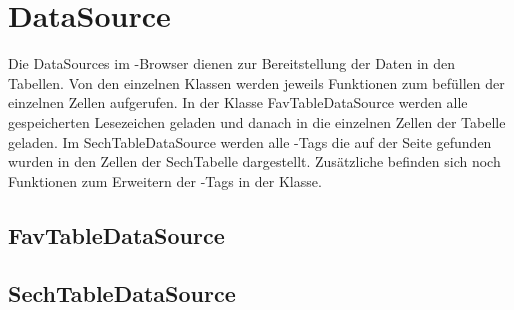 
\section{DataSource}
Die DataSources im \SECH-Browser dienen zur Bereitstellung der Daten in den Tabellen. Von den einzelnen Klassen werden jeweils Funktionen zum befüllen der einzelnen Zellen aufgerufen. In der Klasse FavTableDataSource werden alle gespeicherten Lesezeichen geladen und danach in die einzelnen Zellen der Tabelle geladen. Im SechTableDataSource werden alle \SEARCH-Tags die auf der Seite gefunden wurden in den Zellen der SechTabelle dargestellt. Zusätzliche befinden sich noch Funktionen zum Erweitern der \SEARCH-Tags in der Klasse.

\subsection{FavTableDataSource}
\subsection{SechTableDataSource}



